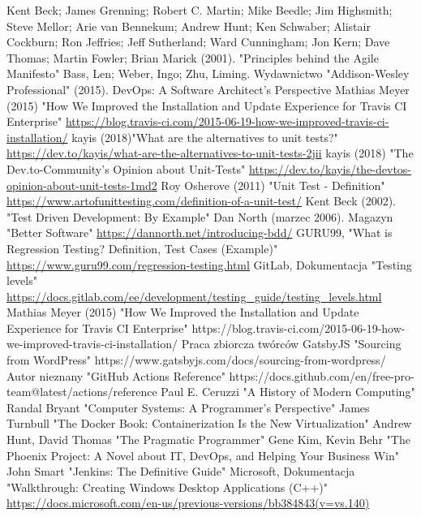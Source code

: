 \documentclass[twoside]{projektInzynierskiMS}
\begin{document}
\begin{thebibliography}{12}

 Kent Beck; James Grenning; Robert C. Martin; Mike Beedle; Jim Highsmith; Steve Mellor; Arie van Bennekum; Andrew Hunt; Ken Schwaber; Alistair Cockburn; Ron Jeffries; Jeff Sutherland; Ward Cunningham; Jon Kern; Dave Thomas; Martin Fowler; Brian Marick (2001). "Principles behind the Agile Manifesto"
 Bass, Len; Weber, Ingo; Zhu, Liming. Wydawnictwo "Addison-Wesley Professional" (2015). DevOps: A Software Architect's Perspective
 Mathias Meyer (2015)  "How We Improved the Installation and Update Experience for Travis CI Enterprise" \url{https://blog.travis-ci.com/2015-06-19-how-we-improved-travis-ci-installation/}
 kayis (2018)"What are the alternatives to unit tests?" \url{https://dev.to/kayis/what-are-the-alternatives-to-unit-tests-2jii}
 kayis (2018) "The Dev.to-Community's Opinion about Unit-Tests" \url{https://dev.to/kayis/the-devtos-opinion-about-unit-tests-1md2}
 Roy Osherove (2011) "Unit Test - Definition" \url{https://www.artofunittesting.com/definition-of-a-unit-test/}
 Kent Beck (2002). "Test Driven Development: By Example"
 Dan North (marzec 2006). Magazyn "Better Software" \url{https://dannorth.net/introducing-bdd/}
 GURU99, "What is Regression Testing? Definition, Test Cases (Example)" \url{https://www.guru99.com/regression-testing.html}
 GitLab, Dokumentacja "Testing levels" \url{https://docs.gitlab.com/ee/development/testing\_guide/testing\_levels.html}
 Mathias Meyer (2015)  "How We Improved the Installation and Update Experience for Travis CI Enterprise" https://blog.travis-ci.com/2015-06-19-how-we-improved-travis-ci-installation/
 Praca zbiorcza twórców GatsbyJS "Sourcing from WordPress" https://www.gatsbyjs.com/docs/sourcing-from-wordpress/
 Autor nieznany "GitHub Actions Reference" https://docs.github.com/en/free-pro-team@latest/actions/reference
 Paul E. Ceruzzi "A History of Modern Computing"
 Randal Bryant "Computer Systems: A Programmer's Perspective"
 James Turnbull "The Docker Book: Containerization Is the New Virtualization"
 Andrew Hunt, David Thomas "The Pragmatic Programmer"
 Gene Kim, Kevin Behr "The Phoenix Project: A Novel about IT, DevOps, and Helping Your Business Win"
 John Smart "Jenkins: The Definitive Guide"
 Microsoft, Dokumentacja "Walkthrough: Creating Windows Desktop Applications (C++)" \url{https://docs.microsoft.com/en-us/previous-versions/bb384843(v=vs.140)}

\end{thebibliography}
\end{document}
